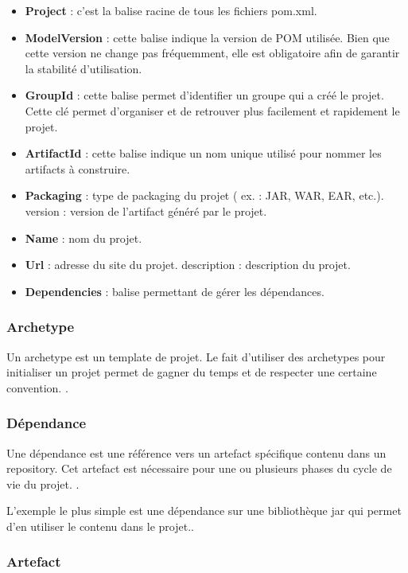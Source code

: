 \begin{itemize}

\item \textbf{Project} : c'est la balise racine de tous les fichiers pom.xml.
\item \textbf{ModelVersion} : cette balise indique la version de POM utilisée. Bien que cette version ne change pas fréquemment, elle est obligatoire afin de garantir la stabilité d'utilisation.
\item \textbf{GroupId} : cette balise permet d'identifier un groupe qui a créé le projet. Cette clé permet d'organiser et de retrouver plus facilement et rapidement le projet.
\item \textbf{ArtifactId} : cette balise indique un nom unique utilisé pour nommer les artifacts à construire.
\item \textbf{Packaging} : type de packaging du projet ( ex. : JAR, WAR, EAR, etc.).
version : version de l'artifact généré par le projet.
\item \textbf{Name} : nom du projet.
\item \textbf{Url} : adresse du site du projet.
description : description du projet.
\item \textbf{Dependencies} : balise permettant de gérer les dépendances.
\end{itemize}

\subsubsection{Archetype }
Un archetype est un template de projet. Le fait d'utiliser des archetypes pour initialiser un projet permet de gagner du temps et de respecter une certaine convention. \parencite{maven}.

\subsubsection{Dépendance  }
 Une dépendance est une référence vers un artefact spécifique contenu dans un repository. Cet artefact est nécessaire pour une ou plusieurs phases du cycle de vie du projet. \parencite{maven}.
 
 L'exemple le plus simple est une dépendance sur une bibliothèque jar qui permet d'en utiliser le contenu dans le projet.\parencite{maven}.
 
 \subsubsection{Artefact }
 
